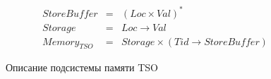 \begin{figure}[hbt]
\begin{minipage}{\linewidth}

\[
\begin{array}{rcl}
StoreBuffer         & = &   (Loc \times Val)^*                                  \\
Storage             & = &   Loc \rightarrow Val                                 \\
Memory_{TSO}        & = &   Storage \times (Tid \rightarrow StoreBuffer)                 
\end{array}
\]

\end{minipage}
\caption{Описание подсистемы памяти TSO}
\label{fig:tso-subsys-def}
\end{figure}

